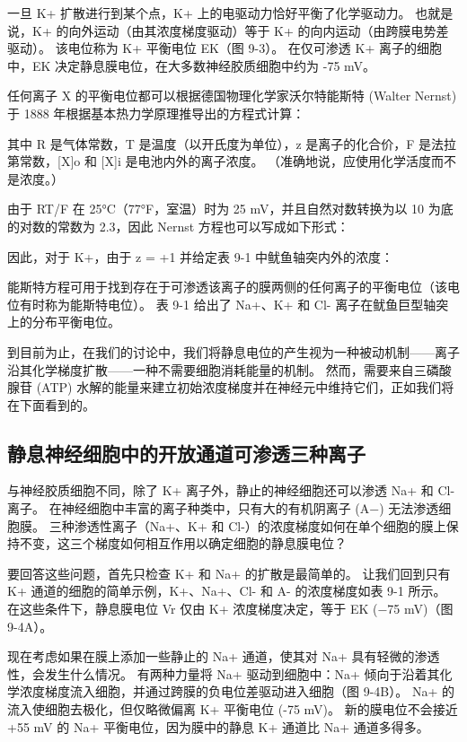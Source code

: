 一旦 K+ 扩散进行到某个点，K+ 上的电驱动力恰好平衡了化学驱动力。 也就是说，K+ 的向外运动（由其浓度梯度驱动）等于 K+ 的向内运动（由跨膜电势差驱动）。 该电位称为 K+ 平衡电位 EK（图 9-3）。 在仅可渗透 K+ 离子的细胞中，EK 决定静息膜电位，在大多数神经胶质细胞中约为 -75 mV。

任何离子 X 的平衡电位都可以根据德国物理化学家沃尔特能斯特 (Walter Nernst) 于 1888 年根据基本热力学原理推导出的方程式计算：


其中 R 是气体常数，T 是温度（以开氏度为单位），z 是离子的化合价，F 是法拉第常数，[X]o 和 [X]i 是电池内外的离子浓度。 （准确地说，应使用化学活度而不是浓度。）

由于 RT/F 在 25°C（77°F，室温）时为 25 mV，并且自然对数转换为以 10 为底的对数的常数为 2.3，因此 Nernst 方程也可以写成如下形式：

因此，对于 K+，由于 z = +1 并给定表 9-1 中鱿鱼轴突内外的浓度：

能斯特方程可用于找到存在于可渗透该离子的膜两侧的任何离子的平衡电位（该电位有时称为能斯特电位）。 表 9-1 给出了 Na+、K+ 和 Cl- 离子在鱿鱼巨型轴突上的分布平衡电位。

到目前为止，在我们的讨论中，我们将静息电位的产生视为一种被动机制——离子沿其化学梯度扩散——一种不需要细胞消耗能量的机制。 然而，需要来自三磷酸腺苷 (ATP) 水解的能量来建立初始浓度梯度并在神经元中维持它们，正如我们将在下面看到的。



\subsection{静息神经细胞中的开放通道可渗透三种离子}
与神经胶质细胞不同，除了 K+ 离子外，静止的神经细胞还可以渗透 Na+ 和 Cl- 离子。 在神经细胞中丰富的离子种类中，只有大的有机阴离子 (A−) 无法渗透细胞膜。 三种渗透性离子（Na+、K+ 和 Cl-）的浓度梯度如何在单个细胞的膜上保持不变，这三个梯度如何相互作用以确定细胞的静息膜电位？

要回答这些问题，首先只检查 K+ 和 Na+ 的扩散是最简单的。 让我们回到只有 K+ 通道的细胞的简单示例，K+、Na+、Cl- 和 A- 的浓度梯度如表 9-1 所示。 在这些条件下，静息膜电位 Vr 仅由 K+ 浓度梯度决定，等于 EK (−75 mV)（图 9-4A）。

现在考虑如果在膜上添加一些静止的 Na+ 通道，使其对 Na+ 具有轻微的渗透性，会发生什么情况。 有两种力量将 Na+ 驱动到细胞中：Na+ 倾向于沿着其化学浓度梯度流入细胞，并通过跨膜的负电位差驱动进入细胞（图 9-4B）。 Na+ 的流入使细胞去极化，但仅略微偏离 K+ 平衡电位 (-75 mV)。 新的膜电位不会接近 +55 mV 的 Na+ 平衡电位，因为膜中的静息 K+ 通道比 Na+ 通道多得多。

